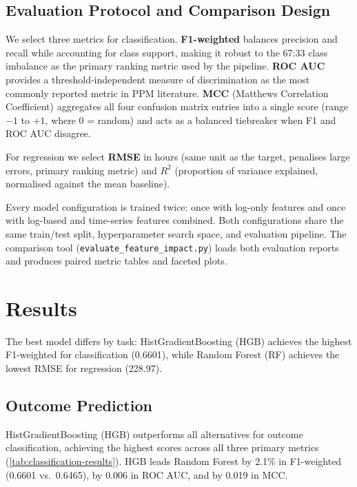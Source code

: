 \documentclass[runningheads]{llncs}
\begin{document}
\subsection{Evaluation Protocol and Comparison Design}
\label{sec:metrics}

We select three metrics for classification. \textbf{F1-weighted} balances
precision and recall while accounting for class support, making it robust to
the 67:33 class imbalance as the primary ranking metric used by the
pipeline. \textbf{ROC AUC} provides a threshold-independent measure of
discrimination as the most commonly reported metric in PPM literature.
\textbf{MCC} (Matthews Correlation Coefficient) aggregates all four confusion
matrix entries into a single score (range $-1$ to $+1$, where 0 = random) and
acts as a balanced tiebreaker when F1 and ROC AUC disagree.

For regression we select \textbf{RMSE} in hours (same unit as the target,
penalises large errors, primary ranking metric) and \textbf{$R^2$}
(proportion of variance explained, normalised against the mean baseline).

Every
model configuration is trained twice: once with log-only features and once
with log-based and time-series features combined. Both configurations share
the same train/test split, hyperparameter search space, and evaluation
pipeline. The comparison tool (\texttt{evaluate\_feature\_impact.py}) loads
both evaluation reports and produces paired metric tables and faceted plots.

\section{Results}
\label{sec:results}

The best model differs by task: HistGradientBoosting (HGB) achieves the
highest F1-weighted for classification (0.6601), while Random Forest (RF)
achieves the lowest RMSE for regression (228.97).

\subsection{Outcome Prediction}
\label{sec:results-outcome}

HistGradientBoosting (HGB) outperforms all alternatives for outcome
classification, achieving the highest scores across all three primary
metrics (\autoref{tab:classification-results}). HGB leads Random Forest
by 2.1\% in F1-weighted (0.6601 vs.\ 0.6465), by 0.006 in ROC AUC, and
by 0.019 in MCC.
\end{document}

